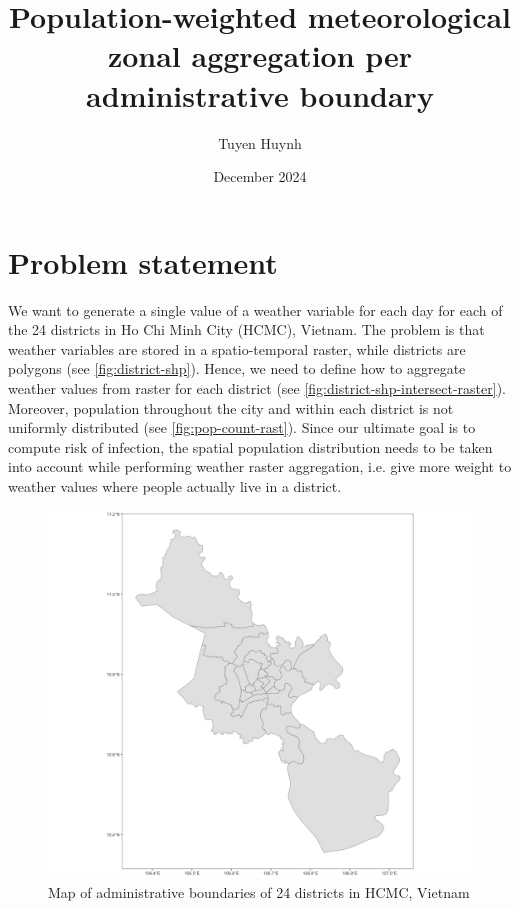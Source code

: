 \documentclass{article}
\title{Population-weighted meteorological zonal aggregation per administrative boundary}
\author{Tuyen Huynh}
\date{December 2024}
\begin{document}
\maketitle

\section{Problem statement}

We want to generate a single value of a weather variable for each day for each of the 24 districts in Ho Chi Minh City (HCMC), Vietnam. The problem is that weather variables are stored in a spatio-temporal raster, while districts are polygons (see \autoref{fig:district-shp}). Hence, we need to define how to aggregate weather values from raster for each district (see \autoref{fig:district-shp-intersect-raster}). Moreover, population throughout the city and within each district is not uniformly distributed (see \autoref{fig:pop-count-rast}). Since our ultimate goal is to compute risk of infection, the spatial population distribution needs to be taken into account while performing weather raster aggregation, i.e. give more weight to weather values where people actually live in a district.

\begin{figure}
    \centering
    \includegraphics[width=0.8\linewidth]{district_shp.png}
    \caption{Map of administrative boundaries of 24 districts in HCMC, Vietnam}
    \label{fig:district-shp}
\end{figure}
\end{document}

